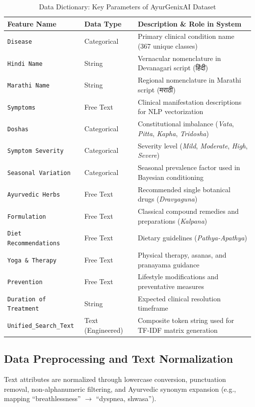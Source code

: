 \documentclass[12pt,a4paper]{article}
\begin{document}
\begin{table}[H]
\centering
\caption{Data Dictionary: Key Parameters of AyurGenixAI Dataset}
\label{tab:datadict}
\begin{tabular}{|l|l|p{8.5cm}|}
\hline
\textbf{Feature Name} & \textbf{Data Type} & \textbf{Description \& Role in System} \\
\hline
\texttt{Disease} & Categorical & Primary clinical condition name (367 unique classes) \\
\texttt{Hindi Name} & String & Vernacular nomenclature in Devanagari script (हिंदी) \\
\texttt{Marathi Name} & String & Regional nomenclature in Marathi script (मराठी) \\
\texttt{Symptoms} & Free Text & Clinical manifestation descriptions for NLP vectorization \\
\texttt{Doshas} & Categorical & Constitutional imbalance (\textit{Vata}, \textit{Pitta}, \textit{Kapha}, \textit{Tridosha}) \\
\texttt{Symptom Severity} & Categorical & Severity level (\textit{Mild}, \textit{Moderate}, \textit{High}, \textit{Severe}) \\
\texttt{Seasonal Variation} & Categorical & Seasonal prevalence factor used in Bayesian conditioning \\
\texttt{Ayurvedic Herbs} & Free Text & Recommended single botanical drugs (\textit{Dravyaguna}) \\
\texttt{Formulation} & Free Text & Classical compound remedies and preparations (\textit{Kalpana}) \\
\texttt{Diet Recommendations} & Free Text & Dietary guidelines (\textit{Pathya-Apathya}) \\
\texttt{Yoga \& Therapy} & Free Text & Physical therapy, asanas, and pranayama guidance \\
\texttt{Prevention} & Free Text & Lifestyle modifications and preventative measures \\
\texttt{Duration of Treatment} & String & Expected clinical resolution timeframe \\
\texttt{Unified\_Search\_Text} & Text (Engineered) & Composite token string used for TF-IDF matrix generation \\
\hline
\end{tabular}
\end{table}

\subsection{Data Preprocessing and Text Normalization}
Text attributes are normalized through lowercase conversion, punctuation removal, non-alphanumeric filtering, and Ayurvedic synonym expansion (e.g., mapping ``breathlessness'' $\rightarrow$ ``dyspnea, shwasa'').
\end{document}

